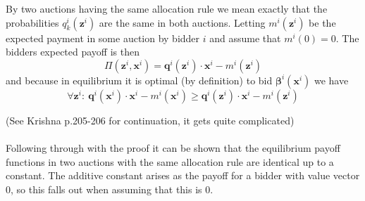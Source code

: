 By two auctions having the same allocation rule we mean exactly that the probabilities $q_k^i(\bm{z}^i)$ are the same in both auctions. Letting $m^i(\bm{z}^i)$ be the expected payment in some auction by bidder $i$ and assume that $m^i(0)=0$. The bidders expected payoff is then 
\begin{equation}
    \Pi(\bm{z}^i,\bm{x}^i) = \bm{q}^i(\bm{z}^i) \cdot \bm{x}^i - m^i(\bm{z}^i)
\end{equation}
and because in equilibrium it is optimal (by definition) to bid $\bm{\beta}^i(\bm{x}^i)$ we have 
\begin{equation}
    \forall \bm{z}^i : \ \bm{q}^i(\bm{x}^i) \cdot \bm{x}^i - m^i(\bm{x}^i) \geq \bm{q}^i(\bm{z}^i) \cdot \bm{x}^i - m^i(\bm{z}^i)
\end{equation}

(See Krishna p.205-206 for continuation, it gets quite complicated)
\\ \\
Following through with the proof it can be shown that the equilibrium payoff functions in two auctions with the same allocation rule are identical up to a constant. The additive constant arises as the payoff for a bidder with value vector $0$, so this falls out when assuming that this is 0. 

